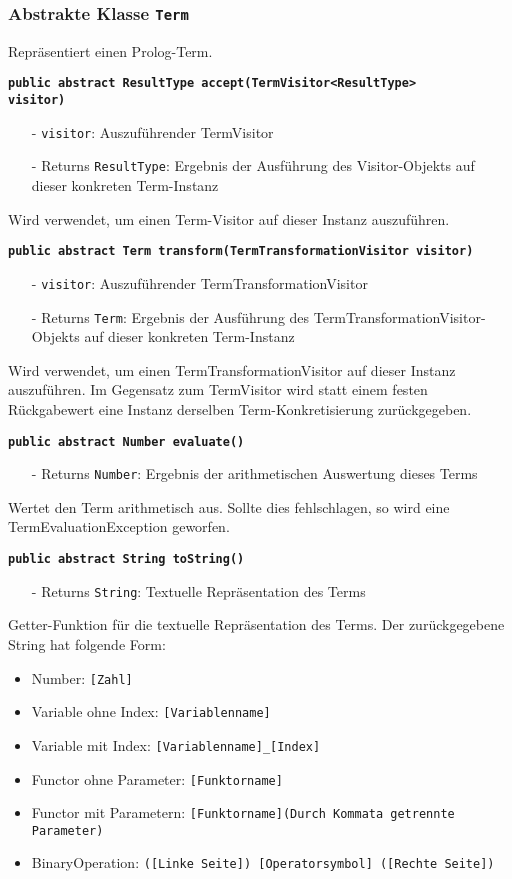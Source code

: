 \documentclass[parskip=full,11pt,twoside]{scrartcl}
\begin{document}
\subsubsection{Abstrakte Klasse \texttt{Term}}
Repräsentiert einen Prolog-Term.

\textbf{\texttt{public abstract ResultType accept(TermVisitor<ResultType>\\visitor)}}
\begin{itemize}[noitemsep]
	\item[-] \texttt{visitor}: Auszuführender TermVisitor
	\item[-] Returns \texttt{ResultType}: Ergebnis der Ausführung des Visitor-Objekts auf dieser konkreten Term-Instanz
\end{itemize}
Wird verwendet, um einen Term-Visitor auf dieser Instanz auszuführen.

\textbf{\texttt{public abstract Term transform(TermTransformationVisitor visitor)}}
\begin{itemize}[noitemsep]
	\item[-] \texttt{visitor}: Auszuführender TermTransformationVisitor 
	\item[-] Returns \texttt{Term}: Ergebnis der Ausführung des TermTransformationVisitor-Objekts auf dieser konkreten Term-Instanz
\end{itemize}
Wird verwendet, um einen TermTransformationVisitor auf dieser Instanz auszuführen. Im Gegensatz zum TermVisitor wird statt einem festen Rückgabewert eine Instanz derselben Term-Konkretisierung zurückgegeben.

\textbf{\texttt{public abstract Number evaluate()}}
\begin{itemize}[noitemsep]
	\item[-] Returns \texttt{Number}: Ergebnis der arithmetischen Auswertung dieses Terms
\end{itemize}
Wertet den Term arithmetisch aus. Sollte dies fehlschlagen, so wird eine TermEvaluationException geworfen.

\textbf{\texttt{public abstract String toString()}}
\begin{itemize}[noitemsep]
	\item[-] Returns \texttt{String}: Textuelle Repräsentation des Terms
\end{itemize}
Getter-Funktion für die textuelle Repräsentation des Terms. Der zurückgegebene String hat folgende Form:
\begin{itemize}
	\item Number: \texttt{[Zahl]}
	\item Variable ohne Index: \texttt{[Variablenname]}
	\item Variable mit Index: \texttt{[Variablenname]\_[Index]}
	\item Functor ohne Parameter: \texttt{[Funktorname]}
	\item Functor mit Parametern: \texttt{[Funktorname](Durch Kommata getrennte Parameter)}
	\item BinaryOperation: \texttt{([Linke Seite]) [Operatorsymbol] ([Rechte Seite])}
\end{itemize}
\end{document}
